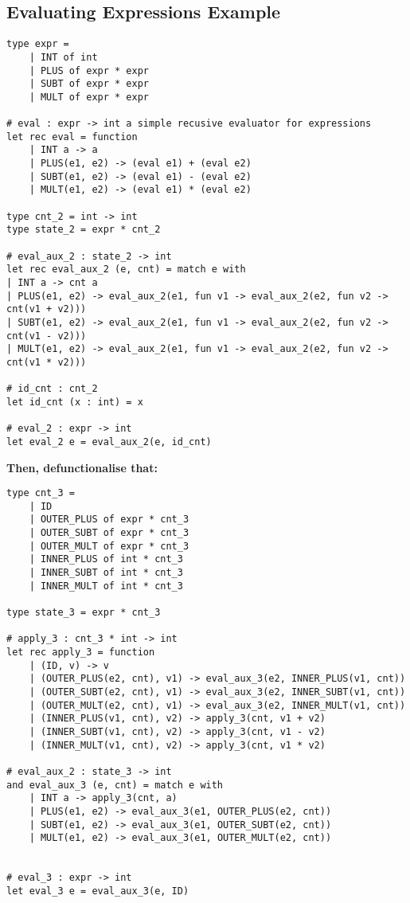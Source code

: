 \documentclass{article}
\begin{document}
\subsection{Evaluating Expressions Example}
\begin{lstlisting}
type expr = 
	| INT of int
	| PLUS of expr * expr 
	| SUBT of expr * expr 
	| MULT of expr * expr
	
# eval : expr -> int a simple recusive evaluator for expressions 
let rec eval = function
	| INT a -> a
	| PLUS(e1, e2) -> (eval e1) + (eval e2)
	| SUBT(e1, e2) -> (eval e1) - (eval e2)
	| MULT(e1, e2) -> (eval e1) * (eval e2)

type cnt_2 = int -> int
type state_2 = expr * cnt_2

# eval_aux_2 : state_2 -> int 
let rec eval_aux_2 (e, cnt) = match e with
| INT a -> cnt a
| PLUS(e1, e2) -> eval_aux_2(e1, fun v1 -> eval_aux_2(e2, fun v2 -> cnt(v1 + v2))) 
| SUBT(e1, e2) -> eval_aux_2(e1, fun v1 -> eval_aux_2(e2, fun v2 -> cnt(v1 - v2))) 
| MULT(e1, e2) -> eval_aux_2(e1, fun v1 -> eval_aux_2(e2, fun v2 -> cnt(v1 * v2)))

# id_cnt : cnt_2 
let id_cnt (x : int) = x

# eval_2 : expr -> int 
let eval_2 e = eval_aux_2(e, id_cnt)
\end{lstlisting}

\noindent
\textbf{Then, defunctionalise that:}
\begin{lstlisting}
type cnt_3 = 
	| ID
	| OUTER_PLUS of expr * cnt_3 
	| OUTER_SUBT of expr * cnt_3 
	| OUTER_MULT of expr * cnt_3 
	| INNER_PLUS of int * cnt_3
	| INNER_SUBT of int * cnt_3 
	| INNER_MULT of int * cnt_3
	
type state_3 = expr * cnt_3

# apply_3 : cnt_3 * int -> int 
let rec apply_3 = function
	| (ID, v) -> v
	| (OUTER_PLUS(e2, cnt), v1) -> eval_aux_3(e2, INNER_PLUS(v1, cnt)) 
	| (OUTER_SUBT(e2, cnt), v1) -> eval_aux_3(e2, INNER_SUBT(v1, cnt)) 
	| (OUTER_MULT(e2, cnt), v1) -> eval_aux_3(e2, INNER_MULT(v1, cnt)) 
	| (INNER_PLUS(v1, cnt), v2) -> apply_3(cnt, v1 + v2)
	| (INNER_SUBT(v1, cnt), v2) -> apply_3(cnt, v1 - v2)
	| (INNER_MULT(v1, cnt), v2) -> apply_3(cnt, v1 * v2)
	
# eval_aux_2 : state_3 -> int 
and eval_aux_3 (e, cnt) = match e with
	| INT a -> apply_3(cnt, a)
	| PLUS(e1, e2) -> eval_aux_3(e1, OUTER_PLUS(e2, cnt)) 
	| SUBT(e1, e2) -> eval_aux_3(e1, OUTER_SUBT(e2, cnt)) 
	| MULT(e1, e2) -> eval_aux_3(e1, OUTER_MULT(e2, cnt))
	

# eval_3 : expr -> int 
let eval_3 e = eval_aux_3(e, ID)
\end{lstlisting}
\end{document}
